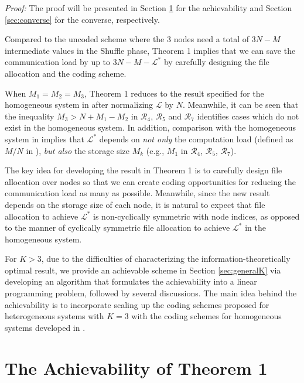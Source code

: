 \documentclass[conference]{IEEEtran}
\begin{document}
{\it Proof:} The proof will be presented in Section \ref{sec:achievability} for the achievability and Section \ref{sec:converse} for the converse, respectively. \hfill\QED

\begin{remark}
Compared to the uncoded scheme where the 3 nodes need a total of $3N-M$ intermediate values in the Shuffle phase, Theorem 1 implies that we can save the communication load by up to $3N-M-{\mathcal L}^*$ by carefully designing the file allocation and the coding scheme.
\end{remark}

\begin{remark}
When $M_1=M_2=M_3$, Theorem 1 reduces to the result specified for the homogeneous system in \cite{Avestimehr_CDC} after normalizing ${\mathcal L}$ by $N$. Meanwhile, it can be seen that the inequality $M_3> N+M_1-M_2$ in $\mathcal{R}_4$, $\mathcal{R}_5$ and $\mathcal{R}_7$ identifies  cases which do not exist in the homogeneous system. In addition, comparison with the homogeneous system in \cite{Avestimehr_CDC} implies that $\mathcal{L}^*$ depends on {\em not only} the computation load (defined as $M/N$ in \cite{Avestimehr_CDC}), {\em but also} the storage size $M_k$ (e.g., $M_1$ in $\mathcal{R}_4$, $\mathcal{R}_5$, $\mathcal{R}_7$).
\end{remark}



The key idea for developing the result in Theorem 1 is to carefully design file allocation over nodes so that we can create coding opportunities for reducing the communication load as many as possible. Meanwhile, since the new result depends on the storage size of each node, it is natural to expect that file allocation to achieve ${\mathcal L}^*$ is non-cyclically symmetric with node indices, as opposed to the manner of cyclically symmetric file allocation to achieve ${\mathcal L}^*$ in the homogeneous system.

For $K\!>\!3$, due to the difficulties of characterizing the information-theoretically optimal result, we provide an achievable scheme in Section \ref{sec:generalK} via developing an algorithm that formulates the achievability into a linear programming problem, followed by several discussions. The main idea behind the achievability is to incorporate scaling up the coding schemes proposed for heterogeneous systems with $K\!=\!3$ with the coding schemes for homogeneous systems developed in \cite{Avestimehr_CDC}.


\section{The Achievability of Theorem 1}\label{sec:achievability}
\end{document}
